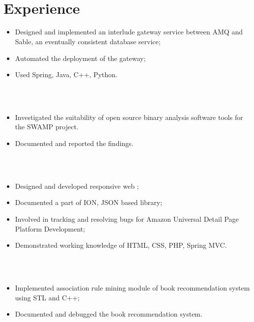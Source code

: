 \documentclass[9pt,a4paper]{moderncv}
\begin{document}
\maketitle
\\\
\section{Experience}
{
\begin{itemize}
 \item Designed and implemented an interlude gateway service between AMQ and Sable, an eventually consistent database service;
 \item Automated the deployment of the gateway;
 \item Used Spring, Java, C++, Python.
\end{itemize}}
\\\
{
\begin{itemize}
 \item Investigated the suitability of open source binary analysis software tools for the SWAMP project.
 \item Documented and reported the findings.
\end{itemize}}
\\\
{
\begin{itemize}
 \item Designed and developed responsive web ;
 \item Documented a part of ION, JSON based library;
 \item Involved in tracking and resolving bugs for Amazon Universal Detail Page Platform Development;
\item Demonstrated working knowledge of HTML, CSS, PHP, Spring MVC.
\end{itemize}}
\\\
{
\begin{itemize}
 \item Implemented association rule mining module of book recommendation system using STL and C++;
 \item Documented and debugged the book recommendation system.
\end{itemize}}
\\\\
\tlmaxdates{2009}{2016}
\end{document}
